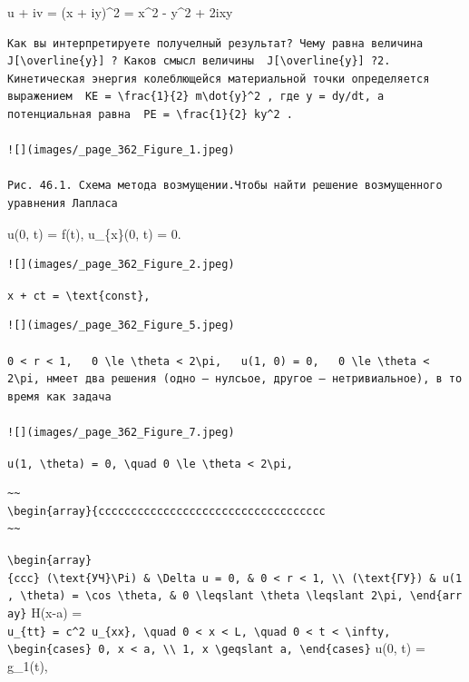 \documentclass[
  ukrainian,
]{article}
\begin{document}
u + iv = (x + iy)\^{}2 = x\^{}2 - y\^{}2 + 2ixy

\begin{verbatim}
Как вы интерпретируете получелный результат? Чему равна величина  J[\overline{y}] ? Каков смысл величины  J[\overline{y}] ?2. Кинетическая энергия колеблющейся материальной точки определяется выражением  KE = \frac{1}{2} m\dot{y}^2 , где y = dy/dt, а потенциальная равна  PE = \frac{1}{2} ky^2 .

![](images/_page_362_Figure_1.jpeg)

Рис. 46.1. Схема метода возмущении.Чтобы найти решение возмущенного уравнения Лапласа
\end{verbatim}

u(0, t) = f(t), u\_\{x\}(0, t) = 0.

\begin{verbatim}
![](images/_page_362_Figure_2.jpeg)
\end{verbatim}

\texttt{x\ +\ ct\ =\ \textbackslash{}text\{const\},}

\begin{verbatim}
![](images/_page_362_Figure_5.jpeg)

0 < r < 1,   0 \le \theta < 2\pi,   u(1, 0) = 0,   0 \le \theta < 2\pi, нмеет два решения (одно — нулсьое, другое — нетривиальное), в то время как задача

![](images/_page_362_Figure_7.jpeg)
\end{verbatim}

\texttt{u(1,\ \textbackslash{}theta)\ =\ 0,\ \textbackslash{}quad\ 0\ \textbackslash{}le\ \textbackslash{}theta\ \textless{}\ 2\textbackslash{}pi,}

\begin{verbatim}
~~
\begin{array}{ccccccccccccccccccccccccccccccccccc
~~
\end{verbatim}

\texttt{\textbackslash{}begin\{array\}\{ccc\}\ (\textbackslash{}text\{УЧ\}\textbackslash{}Pi)\ \&\ \textbackslash{}Delta\ u\ =\ 0,\ \&\ 0\ \textless{}\ r\ \textless{}\ 1,\ \textbackslash{}\textbackslash{}\ (\textbackslash{}text\{ГУ\})\ \&\ u(1,\ \textbackslash{}theta)\ =\ \textbackslash{}cos\ \textbackslash{}theta,\ \&\ 0\ \textbackslash{}leqslant\ \textbackslash{}theta\ \textbackslash{}leqslant\ 2\textbackslash{}pi,\ \textbackslash{}end\{array\}}
H(x-a) =
\texttt{u\_\{tt\}\ =\ c\^{}2\ u\_\{xx\},\ \textbackslash{}quad\ 0\ \textless{}\ x\ \textless{}\ L,\ \textbackslash{}quad\ 0\ \textless{}\ t\ \textless{}\ \textbackslash{}infty,}
\texttt{\textbackslash{}begin\{cases\}\ 0,\ x\ \textless{}\ a,\ \textbackslash{}\textbackslash{}\ 1,\ x\ \textbackslash{}geqslant\ a,\ \textbackslash{}end\{cases\}}
u(0, t) = g\_1(t),
\end{document}
